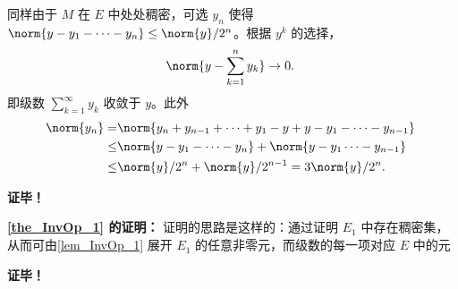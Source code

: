同样由于 $M$ 在 $E$ 中处处稠密，可选 $y_n$ 使得 $\norm{y-y_1-\cdots-y_n}\leq\norm{y}/2^n$。根据 $y^k$ 的选择，
\begin{equation}
\norm{y-\sum_{k=1}^n y_k}\rightarrow0.~
\end{equation}
即级数 $\sum_{k=1}^\infty y_k$ 收敛于 $y$。此外
\begin{equation}
\begin{aligned}
\norm{y_n}=&\norm{y_n+y_{n-1}+\cdots+y_1-y+y-y_1-\cdots-y_{n-1}}\\
\leq&\norm{y-y_1-\cdots-y_{n}}+\norm{y-y_1\cdots-y_{n-1}}\\
\leq&\norm{y}/2^n+\norm{y}/2^{n-1}=3\norm{y}/2^n.
\end{aligned}~
\end{equation}

\textbf{证毕！}

\textbf{\autoref{the_InvOp_1} 的证明：}
证明的思路是这样的：通过证明 $E_1$ 中存在稠密集，从而可由\autoref{lem_InvOp_1} 展开 $E_1$ 的任意非零元，而级数的每一项对应 $E$ 中的元


\textbf{证毕！}



